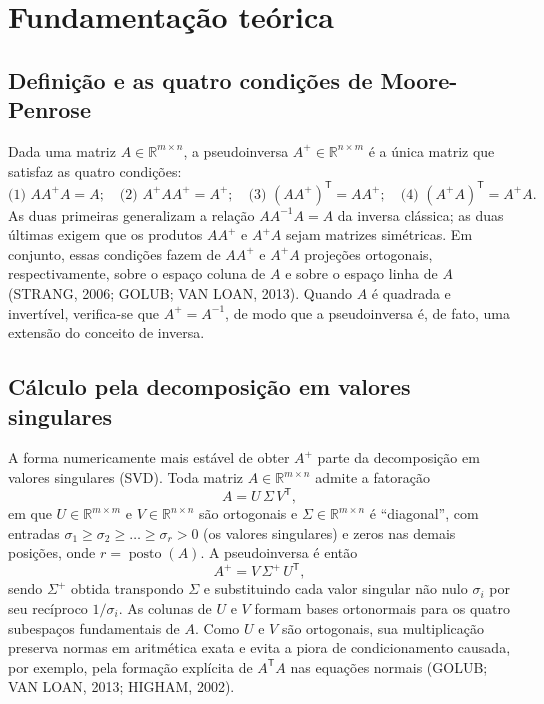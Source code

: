 \documentclass[12pt,a4paper,oneside]{report}
\newcommand{\T}{^{\mathsf{T}}}
\newcommand{\Ap}{A^{+}}
\newcommand{\R}{\mathbb{R}}
\begin{document}
\section{Fundamentação teórica}

\subsection{Definição e as quatro condições de Moore-Penrose}

Dada uma matriz $A \in \R^{m\times n}$, a pseudoinversa $\Ap \in \R^{n\times m}$ é a única
matriz que satisfaz as quatro condições:
\begin{equation}
\text{(1) } A\Ap A = A; \quad
\text{(2) } \Ap A \Ap = \Ap; \quad
\text{(3) } (A\Ap)\T = A\Ap; \quad
\text{(4) } (\Ap A)\T = \Ap A.
\label{eq:mp}
\end{equation}
As duas primeiras generalizam a relação $A A^{-1} A = A$ da inversa clássica; as duas últimas
exigem que os produtos $A\Ap$ e $\Ap A$ sejam matrizes simétricas. Em conjunto, essas condições
fazem de $A\Ap$ e $\Ap A$ projeções ortogonais, respectivamente, sobre o espaço coluna de $A$ e
sobre o espaço linha de $A$ (STRANG, 2006; GOLUB; VAN LOAN, 2013). Quando $A$ é quadrada e invertível, verifica-se que $\Ap = A^{-1}$, de modo que a
pseudoinversa é, de fato, uma extensão do conceito de inversa.

\subsection{Cálculo pela decomposição em valores singulares}

A forma numericamente mais estável de obter $\Ap$ parte da decomposição em valores singulares
(SVD). Toda matriz $A \in \R^{m\times n}$ admite a fatoração
\begin{equation}
A = U\,\Sigma\,V\T,
\label{eq:svd}
\end{equation}
em que $U \in \R^{m\times m}$ e $V \in \R^{n\times n}$ são ortogonais e
$\Sigma \in \R^{m\times n}$ é ``diagonal'', com entradas
$\sigma_1 \ge \sigma_2 \ge \dots \ge \sigma_r > 0$ (os valores singulares) e zeros nas
demais posições, onde $r = \operatorname{posto}(A)$. A pseudoinversa é então
\begin{equation}
\Ap = V\,\Sigma^{+}\,U\T,
\label{eq:pinv}
\end{equation}
sendo $\Sigma^{+}$ obtida transpondo $\Sigma$ e substituindo cada valor singular não nulo
$\sigma_i$ por seu recíproco $1/\sigma_i$. As colunas de $U$ e $V$ formam bases ortonormais
para os quatro subespaços fundamentais de $A$. Como $U$ e $V$ são ortogonais, sua multiplicação
preserva normas em aritmética exata e evita a piora de condicionamento causada, por exemplo,
pela formação explícita de $A\T A$ nas equações normais (GOLUB; VAN LOAN, 2013; HIGHAM, 2002).
\end{document}
